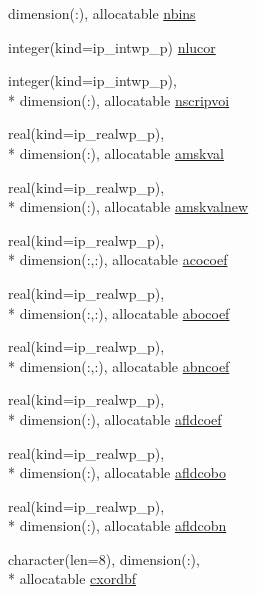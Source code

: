 \begin{DoxyCompactItemize}
dimension(\+:), allocatable \hyperlink{classmod__oasis__namcouple_a4c609c48a20205e1d2aa9938d7babc92}{nbins}
\item 
integer(kind=ip\+\_\+intwp\+\_\+p) \hyperlink{classmod__oasis__namcouple_aee9f6849ec644ee40f465976bc6c7b96}{nlucor}
\item 
integer(kind=ip\+\_\+intwp\+\_\+p), \\*
dimension(\+:), allocatable \hyperlink{classmod__oasis__namcouple_abb6f67bfba2cba424dabee3a465fdfd5}{nscripvoi}
\item 
real(kind=ip\+\_\+realwp\+\_\+p), \\*
dimension(\+:), allocatable \hyperlink{classmod__oasis__namcouple_a92d43fa5eaaff81f0e3f73b303377c02}{amskval}
\item 
real(kind=ip\+\_\+realwp\+\_\+p), \\*
dimension(\+:), allocatable \hyperlink{classmod__oasis__namcouple_a3598202174da65117caf675065f8b160}{amskvalnew}
\item 
real(kind=ip\+\_\+realwp\+\_\+p), \\*
dimension(\+:,\+:), allocatable \hyperlink{classmod__oasis__namcouple_a115cdfe0e05679107363605a992c6386}{acocoef}
\item 
real(kind=ip\+\_\+realwp\+\_\+p), \\*
dimension(\+:,\+:), allocatable \hyperlink{classmod__oasis__namcouple_a1b3f80e8e19f950b806636caadeb704b}{abocoef}
\item 
real(kind=ip\+\_\+realwp\+\_\+p), \\*
dimension(\+:,\+:), allocatable \hyperlink{classmod__oasis__namcouple_a211c98282b89859bee6da0ef60f0d484}{abncoef}
\item 
real(kind=ip\+\_\+realwp\+\_\+p), \\*
dimension(\+:), allocatable \hyperlink{classmod__oasis__namcouple_a19fb86d643bb8761d5a8e32d645d5963}{afldcoef}
\item 
real(kind=ip\+\_\+realwp\+\_\+p), \\*
dimension(\+:), allocatable \hyperlink{classmod__oasis__namcouple_aa9d178659282698ffb6c186ff48bed3c}{afldcobo}
\item 
real(kind=ip\+\_\+realwp\+\_\+p), \\*
dimension(\+:), allocatable \hyperlink{classmod__oasis__namcouple_a207709166cd4d719d65d76e6c043fd6c}{afldcobn}
\item 
character(len=8), dimension(\+:), \\*
allocatable \hyperlink{classmod__oasis__namcouple_a2ee5f8ec71ebae64c3d14445345d7545}{cxordbf}

\end{DoxyCompactItemize}
